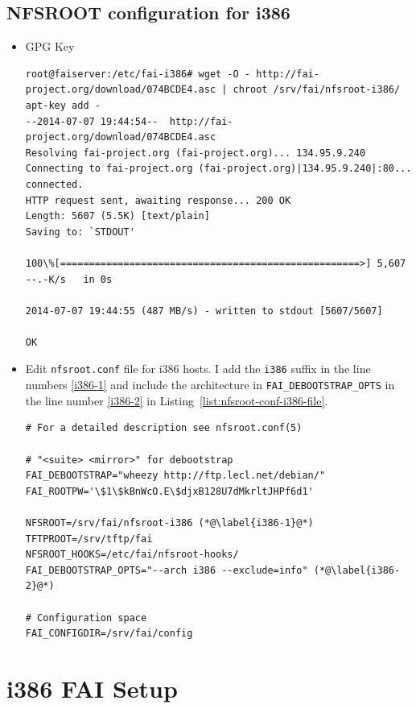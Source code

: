 \documentclass[11pt
  , a4paper
  , article
  , oneside
]{memoir}
\begin{document}
\subsection{NFSROOT configuration for i386}

\begin{itemize}

\item GPG Key

\begin{lstlisting}
root@faiserver:/etc/fai-i386# wget -O - http://fai-project.org/download/074BCDE4.asc | chroot /srv/fai/nfsroot-i386/ apt-key add -
--2014-07-07 19:44:54--  http://fai-project.org/download/074BCDE4.asc
Resolving fai-project.org (fai-project.org)... 134.95.9.240
Connecting to fai-project.org (fai-project.org)|134.95.9.240|:80... connected.
HTTP request sent, awaiting response... 200 OK
Length: 5607 (5.5K) [text/plain]
Saving to: `STDOUT'

100\%[====================================================>] 5,607       --.-K/s   in 0s      

2014-07-07 19:44:55 (487 MB/s) - written to stdout [5607/5607]

OK
\end{lstlisting}

\item Edit \texttt{nfsroot.conf} file for i386 hosts. I add the \texttt{i386} suffix in the line numbers \ref{i386-1} and include the architecture in \texttt{FAI\_DEBOOTSTRAP\_OPTS} in the line number \ref{i386-2} in Listing~\ref{list:nfsroot-conf-i386-file}.

\begin{lstlisting}[style=termstylenumber, caption={Editing \texttt{nfsroot.conf} for i386}, label={list:nfsroot-conf-i386-file}]
# For a detailed description see nfsroot.conf(5)

# "<suite> <mirror>" for debootstrap
FAI_DEBOOTSTRAP="wheezy http://ftp.lecl.net/debian/"
FAI_ROOTPW='\$1\$kBnWcO.E\$djxB128U7dMkrltJHPf6d1'

NFSROOT=/srv/fai/nfsroot-i386 (*@\label{i386-1}@*) 
TFTPROOT=/srv/tftp/fai
NFSROOT_HOOKS=/etc/fai/nfsroot-hooks/
FAI_DEBOOTSTRAP_OPTS="--arch i386 --exclude=info" (*@\label{i386-2}@*) 

# Configuration space
FAI_CONFIGDIR=/srv/fai/config
\end{lstlisting}


\end{itemize}


\section{i386 FAI Setup}
\end{document}
